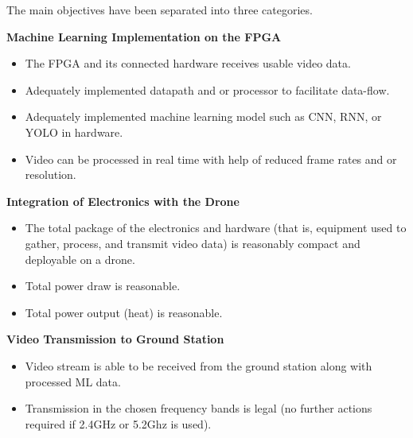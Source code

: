 The main objectives have been separated into three categories.

\textbf{Machine Learning Implementation on the FPGA}
\begin{itemize}
  \item The FPGA and its connected hardware receives usable video data.
  \item Adequately implemented datapath and or processor to facilitate data-flow.
  \item Adequately implemented machine learning model such as CNN, RNN, or YOLO in hardware.
  \item Video can be processed in real time with help of reduced frame rates and or resolution.
\end{itemize}

\textbf{Integration of Electronics with the Drone}
\begin{itemize}
  \item The total package of the electronics and hardware (that is, equipment
  used to gather, process, and transmit video data) is reasonably compact 
  and deployable on a drone.
  \item Total power draw is reasonable.
  \item Total power output (heat) is reasonable.
\end{itemize}

\textbf{Video Transmission to Ground Station}
\begin{itemize}
  \item Video stream is able to be received from the ground station along 
        with processed ML data.
  \item Transmission in the chosen frequency bands is legal (no further actions
        required if 2.4GHz or 5.2Ghz is used).
\end{itemize}
